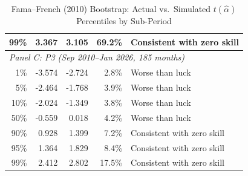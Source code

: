 \begin{table}[!htbp]
{\begin{tabular}[t]{rrrr>{\raggedright\arraybackslash}p{13em}}
\hspace{1em}99\% & 3.367 & 3.105 & 69.2\% & Consistent with zero skill\\
\hline
\multicolumn{5}{l}{\textit{Panel C: P3 (Sep 2010--Jan 2026, 185 months)}}\\
\hspace{1em}1\% & -3.574 & -2.724 & 2.8\% & Worse than luck\\
\hspace{1em}5\% & -2.464 & -1.768 & 3.9\% & Worse than luck\\
\hspace{1em}10\% & -2.024 & -1.349 & 3.8\% & Worse than luck\\
\hspace{1em}50\% & -0.559 & 0.018 & 4.2\% & Worse than luck\\
\hspace{1em}90\% & 0.928 & 1.399 & 7.2\% & Consistent with zero skill\\
\hspace{1em}95\% & 1.364 & 1.829 & 8.4\% & Consistent with zero skill\\
\hspace{1em}99\% & 2.412 & 2.802 & 17.5\% & Consistent with zero skill\\
\bottomrule
\end{tabular}%
}
\setlength{\tabletempwidth}{\wd\tabletempbox}
\ifdim\tabletempwidth>\linewidth\setlength{\tabletempwidth}{\linewidth}\fi
\begin{minipage}{\tabletempwidth}
\captionsetup{width=\linewidth}
\caption{\label{tab:subperiod_bootstrap_tails}Fama--French (2010) Bootstrap: Actual vs.\ Simulated $t(\hat{\alpha})$ Percentiles by Sub-Period}
\ifdim\wd\tabletempbox>\linewidth
  \resizebox{\linewidth}{!}{\usebox{\tabletempbox}}
\else
  \usebox{\tabletempbox}
\fi
\par\medskip
\begin{singlespace}\footnotesize\noindent

\end{singlespace}
\end{minipage}
\end{table}
